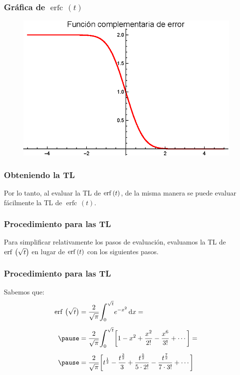 \documentclass[12pt]{beamer}
\DeclareMathOperator\erfc{erfc}
\begin{document}
\begin{frame}
\frametitle{Gráfica de $\erfc \, (t)$}
\begin{figure}
    \centering
    \includegraphics[scale=1]{Imagenes/Plot_Funcion_Error_02.eps}
\end{figure}
\end{frame}
\begin{frame}
\frametitle{Obteniendo la TL}
Por lo tanto, al evaluar la TL de $\erf \, (t)$, de la misma manera se puede evaluar fácilmente la TL de $\erfc \, (t)$.
\end{frame}
\begin{frame}
\frametitle{Procedimiento para las TL}
Para simplificar relativamente los pasos de evaluación, evaluamos la TL de $\erf \, \big( \sqrt{t} \big)$ en lugar de $\erf \,(t)$ con los siguientes pasos.
\end{frame}
\begin{frame}
\frametitle{Procedimiento para las TL}
Sabemos que:
\pause
\begin{eqnarray*}
\begin{aligned}
\erf \, \big( \sqrt{t} \big) &= \dfrac{2}{\sqrt{\pi}} \scaleint{6ex}_{\bs 0}^{\sqrt{t}} e^{-x^{2}} \dd{x} = \\[0.5em] \pause
&= \dfrac{2}{\sqrt{\pi}} \scaleint{6ex}_{\bs 0}^{\sqrt{t}} \bigg[ 1 - x^{2} + \dfrac{x^{2}}{2!} - \dfrac{x^{6}}{3!} + \cdots \bigg] = \\[0.5em] \pause
&= \dfrac{2}{\sqrt{\pi}} \bigg[ t^{\frac{1}{2}} - \dfrac{t^{\frac{3}{2}}}{3} + \dfrac{t^{\frac{5}{2}}}{5 \cdot 2!} - \dfrac{t^{\frac{7}{2}}}{7 \cdot 3!} + \cdots \bigg]
\end{aligned}
\end{eqnarray*}
\end{frame}
\end{document}
